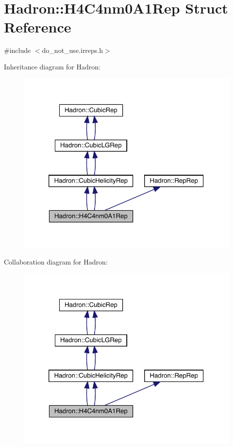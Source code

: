 \hypertarget{structHadron_1_1H4C4nm0A1Rep}{}\section{Hadron\+:\+:H4\+C4nm0\+A1\+Rep Struct Reference}
\label{structHadron_1_1H4C4nm0A1Rep}


{\ttfamily \#include $<$do\+\_\+not\+\_\+use.\+irreps.\+h$>$}



Inheritance diagram for Hadron\+:\nopagebreak
\begin{figure}[H]
\begin{center}
\leavevmode
\includegraphics[width=320pt]{d1/d7f/structHadron_1_1H4C4nm0A1Rep__inherit__graph}
\end{center}
\end{figure}


Collaboration diagram for Hadron\+:\nopagebreak
\begin{figure}[H]
\begin{center}
\leavevmode
\includegraphics[width=320pt]{d7/df1/structHadron_1_1H4C4nm0A1Rep__coll__graph}
\end{center}
\end{figure}
